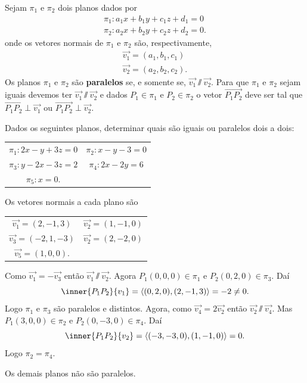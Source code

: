 Sejam $\pi_1$ e $\pi_2$ dois planos dados por
    \begin{align*}
        \pi_1 : a_1x + b_1y + c_1z + d_1 = 0\\
        \pi_2 : a_2x + b_2y + c_2z + d_2 = 0.
    \end{align*}
onde os vetores normais de $\pi_1$ e $\pi_2$ são, respectivamente,
    \begin{align*}
        \vec{v_1} = (a_1, b_1, c_1)\\
        \vec{v_2} = (a_2, b_2, c_2).
    \end{align*}
Os planos $\pi_1$ e $\pi_2$ são \textbf{paralelos} se, e somente se, $\vec{v_1} \varparallel\vec{v_2}$. Para que $\pi_1$ e $\pi_2$ sejam iguais devemos ter $\vec{v_1}\varparallel\vec{v_2}$  e dados $P_1\in\pi_1$ e $P_2\in\pi_2$ o vetor $\vec{P_1P_2}$ deve ser tal que $\vec{P_1P_2}\perp\vec{v_1}$ ou $\vec{P_1P_2}\perp\vec{v_2}$.

\begin{exemplo}
    Dados os seguintes planos, determinar quais são iguais ou paralelos dois a dois:
    \begin{center}
        \begin{tabular}{cc}
            $\pi_1 : 2x - y + 3z = 0$ &
            $\pi_2 : x - y - 3 = 0$\\
            $\pi_3 : y - 2x - 3z = 2$ & $\pi_4 : 2x - 2y = 6$\\
            $\pi_5 : x = 0$.
        \end{tabular}
    \end{center}
    \begin{solucao}
        Os vetores normais a cada plano são
        \begin{center}
            \begin{tabular}{cc}
                $\vec{v_1} = (2, -1, 3)$ & $\vec{v_2} = (1,-1,0)$\\
                $\vec{v_3} = (-2, 1, -3)$ & $\vec{v_2} = (2,-2,0)$\\
                $\vec{v_5} = (1, 0, 0)$.
            \end{tabular}
        \end{center}
        Como $\vec{v_1} = -\vec{v_3}$ então $\vec{v_1}\varparallel\vec{v_2}$. Agora $P_1(0,0,0)\in\pi_1$ e $P_2(0,2,0)\in\pi_3$. Daí
        \[
            \inner{P_1P_2}{v_1} = \langle(0,2,0), (2,-1,3)\rangle = -2 \ne 0.
        \]
        Logo $\pi_1$ e $\pi_3$ são paralelos e distintos.
        Agora, como $\vec{v_4} = 2\vec{v_2}$ então $\vec{v_2}\varparallel\vec{v_4}$. Mas $P_1(3,0,0)\in\pi_2$ e $P_2(0,-3,0)\in\pi_4$. Daí
        \[
            \inner{P_1P_2}{v_2} = \langle(-3,-3,0), (1,-1,0)\rangle = 0.
        \]
        Logo $\pi_2 =\pi_4$.

        Os demais planos não são paralelos.
    \end{solucao}
\end{exemplo}

